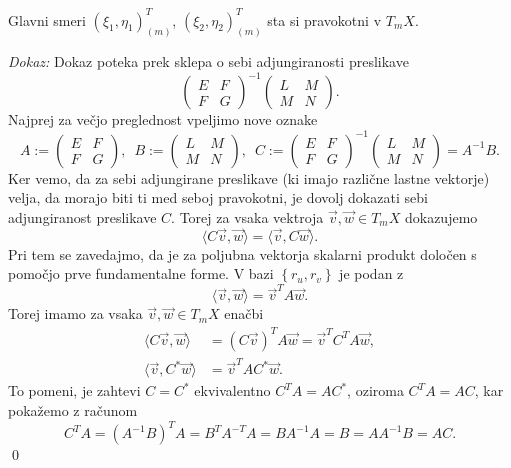 \begin{izrek}
\label{izr_glavni_smeri_sta_si_pravokotni}
Glavni smeri $(\xi_1, \eta_1)_{(m)}^{T}$, $(\xi_2, \eta_2)_{(m)}^{T}$ sta si pravokotni v $T_m X$. 
\end{izrek}
\noindent
{\em Dokaz:\/}
Dokaz poteka prek sklepa o sebi adjungiranosti preslikave \begin{equation*}
  \begin{pmatrix}
    E & F \\
    F & G
    \end{pmatrix}^{-1}\begin{pmatrix}
    L & M \\
    M & N
    \end{pmatrix}.
\end{equation*}  
Najprej za večjo preglednost vpeljimo nove oznake \begin{equation*}
A := \begin{pmatrix}
E & F \\
F & G
\end{pmatrix}, \,\,\, B := \begin{pmatrix}
L & M \\
M & N
\end{pmatrix}, \,\,\, C := \begin{pmatrix}
  E & F \\
  F & G
  \end{pmatrix}^{-1}\begin{pmatrix}
  L & M \\
  M & N
  \end{pmatrix} = A^{-1}B.
\end{equation*}  
Ker vemo, da za sebi adjungirane preslikave (ki imajo različne lastne vektorje) velja, da morajo biti ti med seboj pravokotni,
je dovolj dokazati sebi adjungiranost preslikave $C$. Torej za vsaka vektroja $\vec{v}, \vec{w} \in  T_m X$ dokazujemo \begin{equation*}
\langle C\vec{v}, \vec{w} \rangle = \langle \vec{v}, C \vec{w} \rangle.
\end{equation*}  
Pri tem se zavedajmo, da je za poljubna vektorja skalarni produkt določen s pomočjo prve fundamentalne forme. V bazi $\left\{ r_u, r_v\right\} $ je podan z \begin{equation*}
  \langle \vec{v}, \vec{w} \rangle = \vec{v}^{T} A \vec{w}. 
\end{equation*}  
Torej imamo za vsaka $\vec{v}, \vec{w} \in T_mX$ enačbi \begin{align*}
  \langle C\vec{v}, \vec{w} \rangle &= (C\vec{v})^{T} A \vec{w} = \vec{v}^{T} C^{T} A \vec{w}, \\
  \langle \vec{v}, C^{*} \vec{w} \rangle  &= \vec{v}^{T} A C^{*} \vec{w}.
\end{align*}
To pomeni, je zahtevi $C = C^{*}$ ekvivalentno $C^{T}A= AC^{*}$, oziroma $C^{T}A = AC$, kar pokažemo z računom \begin{equation*}
C^{T}A = (A^{-1}B)^{T}A = B^{T}A^{-T}A = BA^{-1}A = B = A A^{-1} B = AC.
\end{equation*}  
\qed

